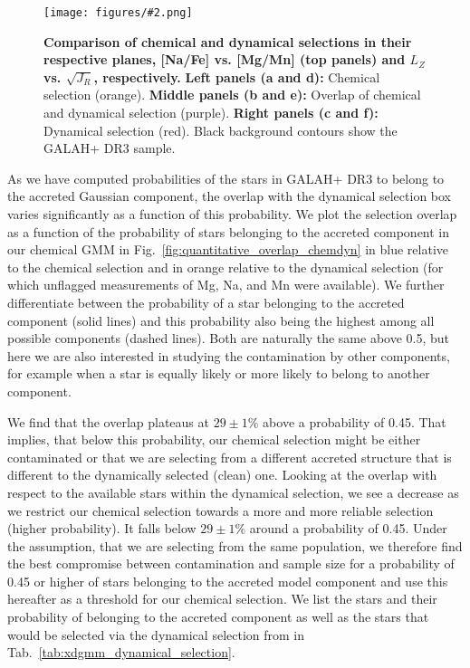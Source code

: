 \documentclass[fleqn,usenatbib]{mnras}
\newcommand{\codeicon}{{\faCloudDownload}}
\newcommand{\codelink}[1]{\href{https://github.com/svenbuder/buder_galah_accreted_chemistry/tree/main/figures/#1.ipynb}{\codeicon}\,\,}
\newcommand{\oscaption}[2]{\caption{#2 \codelink{#1}}}
\newcommand{\figuretextwidth}[4]{\begin{figure*} \centering \texttt{[image: figures/\#2.png]}\oscaption{#3}{#4}\label{fig:#2} \end{figure*}}
\begin{document}
\figuretextwidth{17cm}{chemdyn_selection_plane}{chronochemodynamic_comparison}{
\textbf{Comparison of chemical and dynamical selections in their respective planes, [Na/Fe] vs. [Mg/Mn] (top panels) and $L_Z$ vs. $\sqrt{J_R}$, respectively.}
\textbf{Left panels (a and d):} Chemical selection (orange).
\textbf{Middle panels (b and e):} Overlap of chemical and dynamical selection (purple).
\textbf{Right panels (c and f):} Dynamical selection (red).
Black background contours show the GALAH+ DR3 sample.
}


As we have computed probabilities of the stars in GALAH+ DR3 to belong to the accreted Gaussian component, the overlap with the dynamical selection box varies significantly as a function of this probability. We plot the selection overlap as a function of the probability of stars belonging to the accreted component in our chemical GMM in Fig.~\ref{fig:quantitative_overlap_chemdyn} in blue relative to the chemical selection and in orange relative to the dynamical selection (for which unflagged measurements of Mg, Na, and Mn were available). We further differentiate between the probability of a star belonging to the accreted component (solid lines) and this probability also being the highest among all possible components (dashed lines). Both are naturally the same above 0.5, but here we are also interested in studying the contamination by other components, for example when a star is equally likely or more likely to belong to another component. 

We find that the overlap plateaus at $29\pm1\%$ above a probability of 0.45. That implies, that below this probability, our chemical selection might be either contaminated or that we are selecting from a different accreted structure that is different to the dynamically selected (clean) one. Looking at the overlap with respect to the available stars within the dynamical selection, we see a decrease as we restrict our chemical selection towards a more and more reliable selection (higher probability). It falls below $29\pm1\%$ around a probability of 0.45. Under the assumption, that we are selecting from the same population, we therefore find the best compromise between contamination and sample size for a probability of 0.45 or higher of stars belonging to the accreted model component and use this hereafter as a threshold for our chemical selection. We list the stars and their probability of belonging to the accreted component as well as the stars that would be selected via the dynamical selection from \citet{Feuillet2021} in Tab.~\ref{tab:xdgmm_dynamical_selection}.
\end{document}
